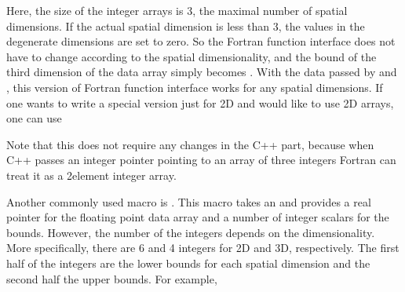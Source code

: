 \documentclass[letterpaper,10pt,english]{sphinxmanual}
\begin{document}
\sphinxAtStartPar
Here, the size of the integer arrays is 3, the maximal number of spatial
dimensions. If the actual spatial dimension is less than 3, the values in the
degenerate dimensions are set to zero. So the Fortran function interface does
not have to change according to the spatial dimensionality, and the bound of
the third dimension of the data array simply becomes . With the
data passed by  and , this
version of Fortran function interface works for any spatial dimensions. If one
wants to write a special version just for 2D and would like to use 2D arrays,
one can use

\begin{sphinxVerbatim}[commandchars=\\\{\}]
     
     
     
\end{sphinxVerbatim}

\sphinxAtStartPar
Note that this does not require any changes in the C++ part, because when
C++ passes an integer pointer pointing to an array of three integers Fortran
can treat it as a 2\sphinxhyphen{}element integer array.

\sphinxAtStartPar
Another commonly used macro is . This macro takes an
 and provides a real pointer for the floating point data array
and a number of integer scalars for the bounds.  However, the number of the
integers depends on the dimensionality.  More specifically, there are 6 and 4
integers for 2D and 3D, respectively. The first half of the integers are the
lower bounds for each spatial dimension and the second half the upper bounds.
For example,
\end{document}
